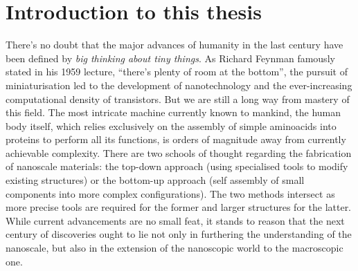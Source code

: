 
\graphicspath{ {\thisch/figures/} }

\chapter*{Introduction to this thesis}\label{intro}

There's no doubt that the major advances of humanity in the last 
century have been defined by \textit{big thinking about tiny things}.
As Richard Feynman famously stated in his 1959 lecture, 
``there's plenty of room at the bottom'', the pursuit
of miniaturisation led to the development of nanotechnology and
the ever-increasing computational density of transistors. But we are
still a long way from mastery of this field.
The most intricate machine currently known to mankind, the human body
itself, which relies exclusively on the assembly of simple aminoacids into proteins 
to perform all its functions, is orders of magnitude away
from currently achievable complexity. There are two schools of thought
regarding the fabrication of nanoscale materials:
the top-down approach (using specialised tools to modify existing 
structures) or the bottom-up approach (self assembly of small 
components into more complex configurations).
The two methods intersect as more precise tools are required for the 
former and larger structures for the latter. 
While current advancements are no small feat, it stands to reason
that the next century of discoveries ought to lie not only in
furthering the understanding of the nanoscale, but also in the
extension of the nanoscopic world to the macroscopic one. 

